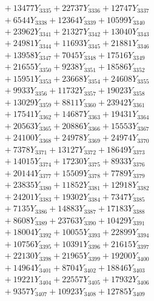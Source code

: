 \documentclass[a4paper,10pt]{article}
\begin{document}
{\begin{align}
&\;  + 13477 Y_{3335} + 22737 Y_{3336} + 12747 Y_{3337} \\[0.3ex]
&\;  + 6544 Y_{3338} + 12364 Y_{3339} + 10599 Y_{3340} \\[0.3ex]
&\;  + 23962 Y_{3341} + 21327 Y_{3342} + 13040 Y_{3343} \\[0.3ex]
&\;  + 24981 Y_{3344} + 11693 Y_{3345} + 21881 Y_{3346} \\[0.3ex]
&\;  + 13958 Y_{3347} + 7045 Y_{3348} + 17516 Y_{3349} \\[0.3ex]
&\;  + 21655 Y_{3350} + 9238 Y_{3351} + 18586 Y_{3352} \\[0.3ex]
&\;  + 15951 Y_{3353} + 23668 Y_{3354} + 24608 Y_{3355} \\[0.3ex]
&\;  + 9933 Y_{3356} + 11732 Y_{3357} + 19023 Y_{3358} \\[0.5ex]\allowbreak
&\;  + 13029 Y_{3359} + 8811 Y_{3360} + 23942 Y_{3361} \\[0.3ex]
&\;  + 17541 Y_{3362} + 14687 Y_{3363} + 19431 Y_{3364} \\[0.3ex]
&\;  + 20563 Y_{3365} + 20886 Y_{3366} + 15553 Y_{3367} \\[0.3ex]
&\;  + 24100 Y_{3368} + 24978 Y_{3369} + 24974 Y_{3370} \\[0.3ex]
&\;  + 7378 Y_{3371} + 13127 Y_{3372} + 18649 Y_{3373} \\[0.3ex]
&\;  + 14015 Y_{3374} + 17230 Y_{3375} + 8933 Y_{3376} \\[0.3ex]
&\;  + 20144 Y_{3377} + 15509 Y_{3378} + 7789 Y_{3379} \\[0.3ex]
&\;  + 23835 Y_{3380} + 11852 Y_{3381} + 12918 Y_{3382} \\[0.3ex]
&\;  + 24201 Y_{3383} + 19302 Y_{3384} + 7347 Y_{3385} \\[0.3ex]
&\;  + 7135 Y_{3386} + 14883 Y_{3387} + 17183 Y_{3388} \\[0.5ex]\allowbreak
&\;  + 8608 Y_{3389} + 23763 Y_{3390} + 10429 Y_{3391} \\[0.3ex]
&\;  + 18004 Y_{3392} + 10055 Y_{3393} + 22899 Y_{3394} \\[0.3ex]
&\;  + 10756 Y_{3395} + 10391 Y_{3396} + 21615 Y_{3397} \\[0.3ex]
&\;  + 22130 Y_{3398} + 21965 Y_{3399} + 19200 Y_{3400} \\[0.3ex]
&\;  + 14964 Y_{3401} + 8704 Y_{3402} + 18846 Y_{3403} \\[0.3ex]
&\;  + 19221 Y_{3404} + 22557 Y_{3405} + 17932 Y_{3406} \\[0.3ex]
&\;  + 9357 Y_{3407} + 10923 Y_{3408} + 12785 Y_{3409} \\[0.3ex]

\end{align}}
\end{document}
